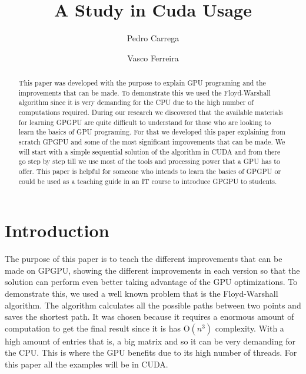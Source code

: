 \documentclass[runningheads]{llncs}
\begin{document}
\title{A Study in Cuda Usage}
\author{Pedro Carrega \and
Vasco Ferreira
}


\maketitle

\begin{abstract}
This paper was developed with the purpose to explain GPU programing and the improvements that can be made. To demonstrate this we used the Floyd-Warshall algorithm since it is very demanding for the CPU due to the high number of computations required. During our research we discovered that the available materials for learning GPGPU are quite difficult to understand for those who are looking to learn the basics of GPU programing. For that we developed this paper explaining from scratch GPGPU and some of the most significant improvements that can be made. We will start with a simple sequential solution of the algorithm in CUDA and from there go step by step till we use most of the tools and processing power that a GPU has to offer. This paper is helpful for someone who intends to learn the basics of GPGPU or could be used as a teaching guide in an IT course to introduce GPGPU to students.

\end{abstract}
%
%
%
\section{Introduction}

The purpose of this paper is to teach the different improvements that can be made on GPGPU, showing the different improvements in each version so that the solution can perform even better taking advantage of the GPU optimizations. To demonstrate this, we used a well known problem that is the Floyd-Warshall algorithm. The algorithm calculates all the possible paths between two points and saves the shortest path. It was chosen because it requires a enormous amount of computation to get the final result since it is has O$(n^{3})$ complexity. With a high amount of entries that is, a big matrix and so it can be very demanding for the CPU. This is where the GPU benefits due to its high number of threads.
\newline
For this paper all the examples will be in CUDA.
\end{document}
